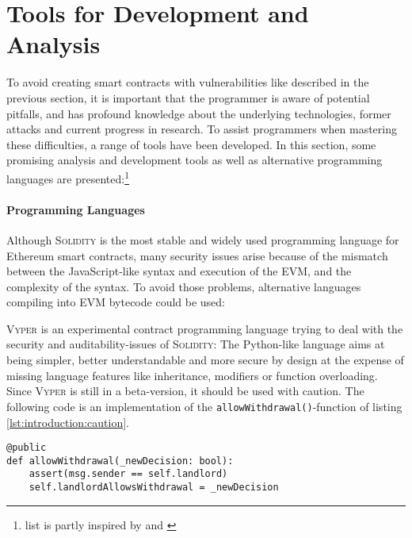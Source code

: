 \section{Tools for Development and Analysis}
To avoid creating smart contracts with vulnerabilities like described in the previous section, it is important that the programmer is aware of potential pitfalls, and has profound knowledge about the underlying technologies, former attacks and current progress in research. To assist programmers when mastering these difficulties, a range of tools have been developed. In this section, some promising analysis and development tools as well as alternative programming languages are presented:\footnote{list is partly inspired by \cite{parity:newdevprocesses} and \cite{ntnu:smartcontractsecurity}}

\paragraph{Programming Languages}
Although \textsc{Solidity} is the most stable and widely used programming language for Ethereum smart contracts, many security issues arise because of the mismatch between the JavaScript-like syntax and execution of the EVM, and the complexity of the syntax. To avoid those problems, alternative languages compiling into EVM bytecode could be used:

\textsc{Vyper} \cite{github:vyper} is an experimental contract programming language trying to deal with the security and auditability-issues of \textsc{Solidity}: The Python-like language aims at being simpler, better understandable and more secure by design at the expense of missing language features like inheritance, modifiers or function overloading. Since \textsc{Vyper} is still in a beta-version, it should be used with caution. The following code is an implementation of the \texttt{allowWithdrawal()}-function of listing \ref{lst:introduction:caution}.
\begin{verbatim}
@public
def allowWithdrawal(_newDecision: bool):
    assert(msg.sender == self.landlord)
    self.landlordAllowsWithdrawal = _newDecision
\end{verbatim}

